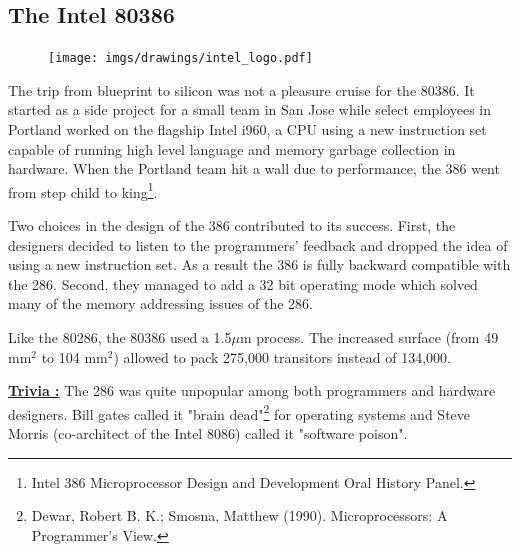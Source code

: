\documentclass[book.tex]{subfiles}
\begin{document}
\subsection{The Intel 80386}
  \begin{figure}
\centering
\vspace{-10pt}
\texttt{[image: imgs/drawings/intel\_logo.pdf]}
\end{figure}
The trip from blueprint to silicon was not a pleasure cruise for the 80386. It started as a side project for a small team in San Jose while select employees in Portland worked on the flagship Intel i960, a CPU using a new instruction set capable of running high level language and memory garbage collection in hardware. When the Portland team hit a wall due to performance, the 386 went from step child to king\footnote{Intel 386 Microprocessor Design and Development Oral History Panel.}.\\
\par
Two choices in the design of the 386 contributed to its success. First, the designers decided to listen to the programmers' feedback and dropped the idea of using a new instruction set. As a result the 386 is fully backward compatible with the 286. Second, they managed to add a 32 bit operating mode which solved many of the memory addressing issues of the 286.\\
\par
Like the 80286, the 80386 used a 1.5$\mu$m process. The increased surface (from 49 mm$^2$ to 104 mm$^2$) allowed to pack 275,000 transitors instead of 134,000.\\
\par
\textbf{\underline{Trivia :}}  The 286 was quite unpopular among both programmers and hardware designers. Bill gates called it "brain dead"\footnote{Dewar, Robert B. K.; Smosna, Matthew (1990). Microprocessors: A Programmer's View.} for operating systems and Steve Morris (co-architect of the Intel 8086) called it "software poison".\\
\par


\par \vspace{-1pt}
\begin{minipage}{0.48\textwidth}
\centering
{} 

\end{minipage}
\hfill
\begin{minipage}{0.48\textwidth}
\centering
{}
\end{minipage}
\end{document}
